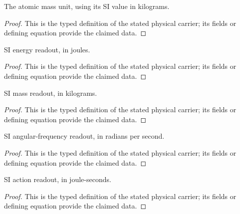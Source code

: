 \begin{definition}
  \label{def:physics:IPhO_2026_1_C_2:aux005}
  The atomic mass unit, using its SI value in kilograms.
\end{definition}
\begin{proof}
  This is the typed definition of the stated physical carrier; its fields or defining equation provide the claimed data.
\end{proof}

\begin{definition}
  \label{def:physics:IPhO_2026_1_C_2:aux006}
  SI energy readout, in joules.
\end{definition}
\begin{proof}
  This is the typed definition of the stated physical carrier; its fields or defining equation provide the claimed data.
\end{proof}

\begin{definition}
  \label{def:physics:IPhO_2026_1_C_2:aux007}
  SI mass readout, in kilograms.
\end{definition}
\begin{proof}
  This is the typed definition of the stated physical carrier; its fields or defining equation provide the claimed data.
\end{proof}

\begin{definition}
  \label{def:physics:IPhO_2026_1_C_2:aux008}
  SI angular-frequency readout, in radians per second.
\end{definition}
\begin{proof}
  This is the typed definition of the stated physical carrier; its fields or defining equation provide the claimed data.
\end{proof}

\begin{definition}
  \label{def:physics:IPhO_2026_1_C_2:aux009}
  SI action readout, in joule-seconds.
\end{definition}
\begin{proof}
  This is the typed definition of the stated physical carrier; its fields or defining equation provide the claimed data.
\end{proof}

